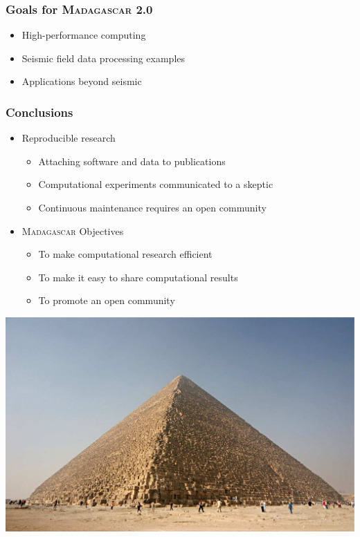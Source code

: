\begin{frame}
\MadLogo
\frametitle{Goals for \textsc{Madagascar} 2.0}
\begin{itemize}
\item High-performance computing
\item Seismic field data processing examples
\item Applications beyond seismic
\end{itemize}
\end{frame}

\begin{frame}
\MadLogo
\frametitle{Conclusions}
\bfseries
\centering
  \begin{itemize}
  \item Reproducible research
    \begin{itemize}
    \item Attaching software and data to publications
    \item Computational experiments communicated to a skeptic
    \item Continuous maintenance requires an open community
    \end{itemize}
  \item \textsc{Madagascar} Objectives
    \begin{itemize}
    \item To make computational research efficient
    \item To make it easy to share computational results
    \item To promote an open community
    \end{itemize}
\end{itemize}
    \begin{center}
      \includegraphics[height=0.4\textheight]{Fig/Kheops-Pyramid}
    \end{center}
  \end{frame}
